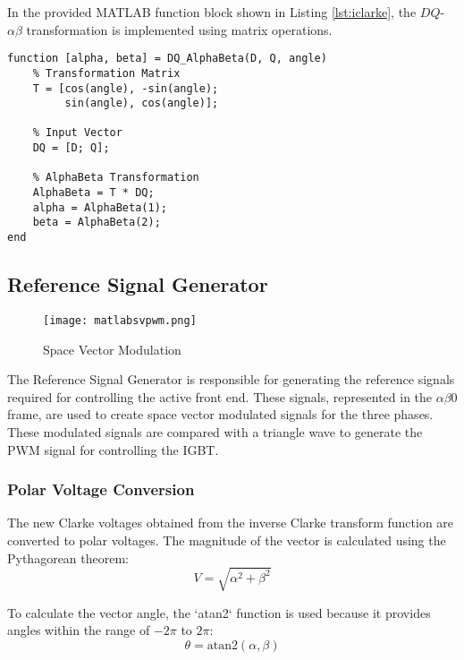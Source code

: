In the provided MATLAB function block shown in Listing \ref{lst:iclarke}, the
\( DQ \)-\( \alpha\beta \) transformation is implemented using matrix
operations.\\

\begin{lstlisting}[style=MATLAB, caption={Three-Phase Phase-Locked Loop}, label={lst:iclarke}]
    function [alpha, beta] = DQ_AlphaBeta(D, Q, angle)
    % Transformation Matrix
    T = [cos(angle), -sin(angle);
         sin(angle), cos(angle)];
     
    % Input Vector
    DQ = [D; Q];
    
    % AlphaBeta Transformation
    AlphaBeta = T * DQ;
    alpha = AlphaBeta(1);
    beta = AlphaBeta(2);
end
\end{lstlisting}

\subsection{Reference Signal Generator}

\begin{figure}[h]
    \centering
    \texttt{[image: matlabsvpwm.png]}
    \caption{Space Vector Modulation }
    \label{fig:spaceyfinal}
\end{figure}
The Reference Signal Generator is responsible for generating the reference
signals required for controlling the active front end. These signals,
represented in the \( \alpha\beta0 \) frame, are used to create space vector
modulated signals for the three phases. These modulated signals are compared
with a triangle wave to generate the PWM signal for controlling the IGBT.

\subsubsection{Polar Voltage Conversion}
The new Clarke voltages obtained from the inverse Clarke transform function are
converted to polar voltages. The magnitude of the vector is calculated using
the Pythagorean theorem:
\begin{equation*}
    V = \sqrt{\alpha^2 + \beta^2}
\end{equation*}

To calculate the vector angle, the `atan2` function is used because it provides
angles within the range of \( -2\pi \) to \( 2\pi \):
\begin{equation*}
    \theta = \text{atan2}(\alpha,\beta)
\end{equation*}

